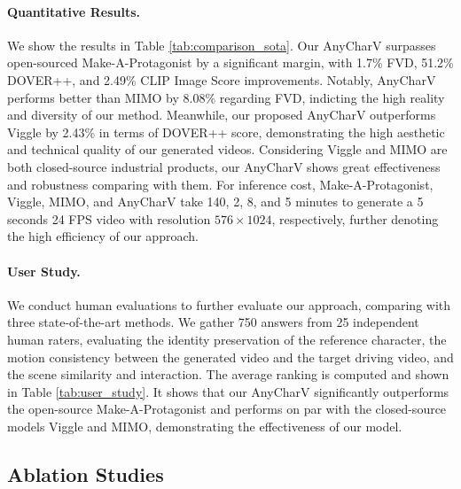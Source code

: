 \paragraph{Quantitative Results.}
We show the results in Table \ref{tab:comparison_sota}. 
Our AnyCharV surpasses open-sourced Make-A-Protagonist by a significant margin, with 1.7\% FVD, 51.2\% DOVER++, and 2.49\% CLIP Image Score improvements.
Notably, AnyCharV performs better than MIMO by 8.08\% regarding FVD, indicting the high reality and diversity of our method.
Meanwhile, our proposed AnyCharV outperforms Viggle by 2.43\% in terms of DOVER++ score, demonstrating the high aesthetic and technical quality of our generated videos.
Considering Viggle and MIMO are both closed-source industrial products, our AnyCharV shows great effectiveness and robustness comparing with them.
For inference cost, Make-A-Protagonist, Viggle, MIMO, and AnyCharV take 140, 2, 8, and 5 minutes to generate a 5 seconds 24 FPS video with resolution $576 \times 1024$, respectively, further denoting the high efficiency of our approach.






\paragraph{User Study.}
We conduct human evaluations to further evaluate our approach, comparing with three state-of-the-art methods.
We gather 750 answers from 25 independent human raters, evaluating the identity preservation of the reference character, the motion consistency between the generated video and the target driving video, and the scene similarity and interaction.
The average ranking is computed and shown in Table \ref{tab:user_study}.
It shows that our AnyCharV significantly outperforms the open-source Make-A-Protagonist and performs on par with the closed-source models Viggle and MIMO, demonstrating the effectiveness of our model.









\subsection{Ablation Studies}


